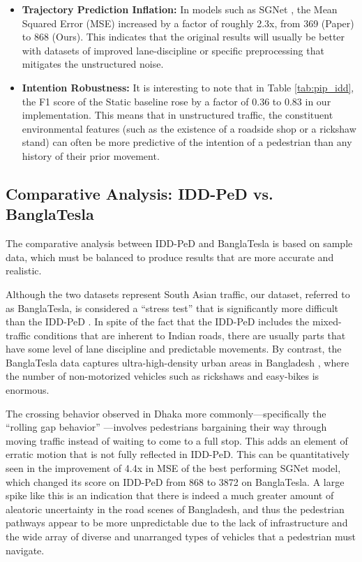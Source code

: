 \documentclass[12pt, a4paper]{article}
\begin{document}
\begin{itemize}
    \item \textbf{Trajectory Prediction Inflation:} In models such as SGNet \cite{wang2022stepwise}, the Mean Squared Error (MSE) increased by a factor of roughly 2.3x, from 369 (Paper) to 868 (Ours). This indicates that the original results will usually be better with datasets of improved lane-discipline or specific preprocessing that mitigates the unstructured noise.
    \item \textbf{Intention Robustness:} It is interesting to note that in Table \ref{tab:pip_idd}, the F1 score of the Static baseline rose by a factor of 0.36 to 0.83 in our implementation. This means that in unstructured traffic, the constituent environmental features (such as the existence of a roadside shop or a rickshaw stand) can often be more predictive of the intention of a pedestrian than any history of their prior movement.
\end{itemize}

\subsection{Comparative Analysis: IDD-PeD vs. BanglaTesla}
The comparative analysis between IDD-PeD and BanglaTesla is based on sample data, which must be balanced to produce results that are more accurate and realistic.

Although the two datasets represent South Asian traffic, our dataset, referred to as BanglaTesla, is considered a ``stress test'' that is significantly more difficult than the IDD-PeD \cite{bokkasam2025pedestrian}. In spite of the fact that the IDD-PeD includes the mixed-traffic conditions that are inherent to Indian roads, there are usually parts that have some level of lane discipline and predictable movements. By contrast, the BanglaTesla data captures ultra-high-density urban areas in Bangladesh \cite{baig2024badodd}, where the number of non-motorized vehicles such as rickshaws and easy-bikes is enormous. 

The crossing behavior observed in Dhaka more commonly—specifically the ``rolling gap behavior'' \cite{vasudevan2020pedestrian}—involves pedestrians bargaining their way through moving traffic instead of waiting to come to a full stop. This adds an element of erratic motion that is not fully reflected in IDD-PeD. This can be quantitatively seen in the improvement of 4.4x in MSE of the best performing SGNet model, which changed its score on IDD-PeD from 868 to 3872 on BanglaTesla. A large spike like this is an indication that there is indeed a much greater amount of aleatoric uncertainty in the road scenes of Bangladesh, and thus the pedestrian pathways appear to be more unpredictable due to the lack of infrastructure and the wide array of diverse and unarranged types of vehicles that a pedestrian must navigate.
\end{document}
